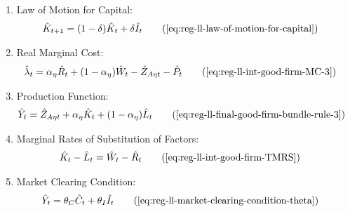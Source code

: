 \documentclass[
	thesis.tex
	]{subfiles}
\begin{document}
{\begin{itemize}
\begin{enumerate}
			\item Law of Motion for Capital:
			\begin{align}
				\hat{K}_{t+1} &= (1-\delta)\hat{K}_t + \delta \hat{I}_t
				\tag{\ref{eq:reg-ll-law-of-motion-for-capital}}
			\end{align}
			
			
			\item Real Marginal Cost:
			\begin{align}
				\hat{\lambda}_t &= {\alpha_\eta} \hat{R}_t + (1- {\alpha_\eta}) \hat{W}_t - \hat{Z}_{A\eta t} - \hat{P}_t \tag{\ref{eq:reg-ll-int-good-firm-MC-3}}
			\end{align}
			
			\item Production Function:
			\begin{align}
				\hat{Y}_t &= \hat{Z}_{A\eta t} + {\alpha_\eta} \hat{K}_t + (1-{\alpha_\eta}) \hat{L}_t \tag{\ref{eq:reg-ll-final-good-firm-bundle-rule-3}}
			\end{align}
			
			
			\item Marginal Rates of Substitution of Factors:
			\begin{align}
				\hat{K}_t - \hat{L}_t &= \hat{W}_t - \hat{R}_t \tag{\ref{eq:reg-ll-int-good-firm-TMRS}}
			\end{align}
			
			\item Market Clearing Condition:
			\begin{align}
				\hat{Y}_t &= \theta_C \hat{C}_t + \theta_I \hat{I}_t 
				\tag{\ref{eq:reg-ll-market-clearing-condition-theta}}
			\end{align}
			

\end{enumerate}
\end{itemize}}
\end{document}
